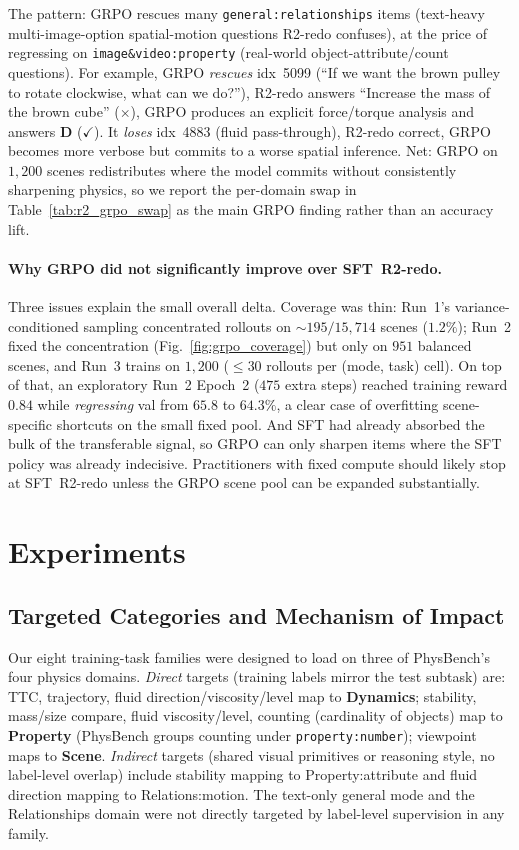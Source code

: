 \documentclass{article}
\newcommand{\cmark}{\ensuremath{\checkmark}}
\newcommand{\xmark}{\ensuremath{\times}}
\begin{document}
The pattern: GRPO rescues many \texttt{general:relationships} items
(text-heavy multi-image-option spatial-motion questions R2-redo
confuses), at the price of regressing on \texttt{image\&video:property}
(real-world object-attribute/count questions). For example, GRPO
\emph{rescues} idx~5099 (``If we want the brown pulley to rotate
clockwise, what can we do?''), R2-redo answers ``Increase the
mass of the brown cube'' (\xmark), GRPO produces an explicit
force/torque analysis and answers \textbf{D} (\cmark). It \emph{loses}
idx~4883 (fluid pass-through), R2-redo correct, GRPO becomes more
verbose but commits to a worse spatial inference. Net: GRPO on
$1{,}200$ scenes redistributes where the model commits without
consistently sharpening physics, so we report the per-domain swap in
Table~\ref{tab:r2_grpo_swap} as the main GRPO finding rather than an
accuracy lift.

\paragraph{Why GRPO did not significantly improve over SFT~R2-redo.}
Three issues explain the small overall delta. Coverage was thin:
Run~1's variance-conditioned sampling concentrated rollouts on
$\sim 195/15{,}714$ scenes ($1.2\%$); Run~2 fixed the concentration
(Fig.~\ref{fig:grpo_coverage}) but only on $951$ balanced scenes,
and Run~3 trains on $1{,}200$ ($\leq 30$ rollouts per (mode, task)
cell). On top of that, an exploratory Run~2 Epoch~2 ($475$ extra
steps) reached training reward $0.84$ while \emph{regressing} val
from $65.8$ to $64.3\%$, a clear case of overfitting scene-specific
shortcuts on the small fixed pool. And SFT had already absorbed the
bulk of the transferable signal, so GRPO can only sharpen items
where the SFT policy was already indecisive. Practitioners with
fixed compute should likely stop at SFT~R2-redo unless the GRPO
scene pool can be expanded substantially.

\section{Experiments}
\label{sec:exp}

\subsection{Targeted Categories and Mechanism of Impact}
\label{sec:targets}

Our eight training-task families were designed to load on three of
PhysBench's four physics domains. \emph{Direct} targets (training
labels mirror the test subtask) are: TTC, trajectory, fluid
direction/viscosity/level map to \textbf{Dynamics}; stability, mass/size
compare, fluid viscosity/level, counting (cardinality of objects)
map to \textbf{Property} (PhysBench groups counting under
\texttt{property:number}); viewpoint maps to \textbf{Scene}.
\emph{Indirect} targets (shared visual primitives or reasoning style,
no label-level overlap) include stability mapping to Property:attribute
and fluid direction mapping to Relations:motion. The text-only general
mode and the Relationships domain were not directly targeted by
label-level supervision in any family.
\end{document}
